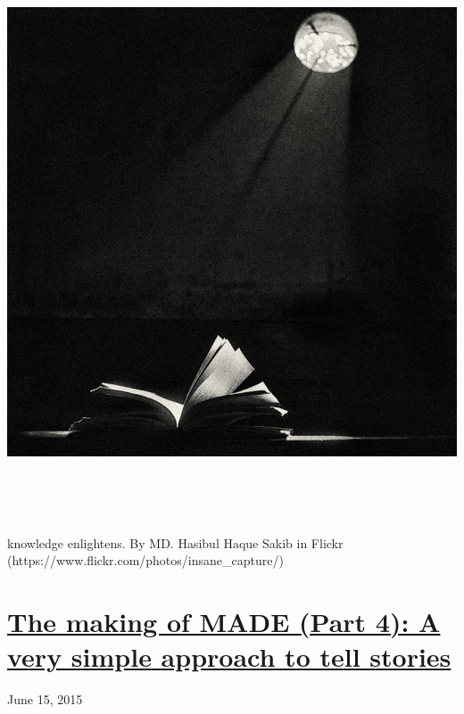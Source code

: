 \documentclass[a4paper]{article}
\begin{document}
\href{http://www.velonuboso.com/made/blog/wp-content/uploads/2015/06/5581597956_1bdcaabcd4_o.jpg}{
\includegraphics[width=17.018cm,height=17.018cm]{makingofmade113-img3.jpg}
}

knowledge enlightens. By MD. Hasibul Haque Sakib in Flickr
(https://www.flickr.com/photos/insane\_capture/)

\bigskip

\clearpage\section[The making of MADE (Part 4): A very simple approach
to tell
stories]{\href{http://www.velonuboso.com/made/2015/06/15/making-part-4-simple-approach-stories/}{The
making of MADE (Part 4): A very simple approach to tell stories}}
June 15, 2015
\end{document}
